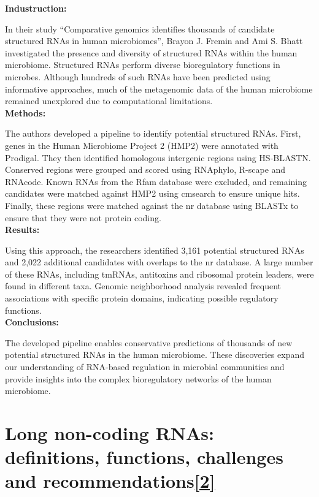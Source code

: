 \documentclass{article}
\begin{document}
\begin{large}
\begin{large}
\begin{large}
\textbf{Industruction:}\par
In their study “Comparative genomics identifies thousands of candidate structured RNAs in human microbiomes”, Brayon J. Fremin and Ami S. Bhatt investigated the presence and diversity of structured RNAs within the human microbiome. Structured RNAs perform diverse bioregulatory functions in microbes. Although hundreds of such RNAs have been predicted using informative approaches, much of the metagenomic data of the human microbiome remained unexplored due to computational limitations.\\[0.5em]

\textbf{Methods:}\par
The authors developed a pipeline to identify potential structured RNAs. First, genes in the Human Microbiome Project 2 (HMP2) were annotated with Prodigal. They then identified homologous intergenic regions using HS-BLASTN. Conserved regions were grouped and scored using RNAphylo, R-scape and RNAcode. Known RNAs from the Rfam database were excluded, and remaining candidates were matched against HMP2 using cmsearch to ensure unique hits. Finally, these regions were matched against the nr database using BLASTx to ensure that they were not protein coding.\\[0.5em]

\textbf{Results:}\par
Using this approach, the researchers identified 3,161 potential structured RNAs and 2,022 additional candidates with overlaps to the nr database. A large number of these RNAs, including tmRNAs, antitoxins and ribosomal protein leaders, were found in different taxa. Genomic neighborhood analysis revealed frequent associations with specific protein domains, indicating possible regulatory functions.\\[0.5em]

\textbf{Conclusions:}\par
The developed pipeline enables conservative predictions of thousands of new potential structured RNAs in the human microbiome. These discoveries expand our understanding of RNA-based regulation in microbial communities and provide insights into the complex bioregulatory networks of the human microbiome.\\[0.5em]

\clearpage

\section{Long non-coding RNAs: definitions, functions, challenges and recommendations\href{https://pubmed.ncbi.nlm.nih.gov/36596869/}{\textbf{[2]}}}


\end{large}
\end{large}
\end{large}
\end{document}

